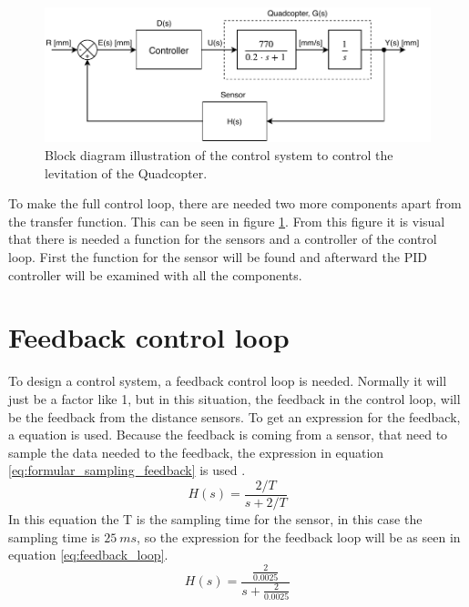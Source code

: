  \begin{figure}[H]
     \centering
     \includegraphics[width=\textwidth]{figures/ch_design/controller/ControlDiagramTF.pdf}
     \caption{Block diagram illustration of the control system  to control the levitation of the Quadcopter.}
     \label{fig:controlDiagram}
 \end{figure}

To make the full control loop, there are needed two more components apart from the transfer function. This can be seen in figure \ref{fig:controlDiagram}. From this figure it is visual that there is needed a function for the sensors and a controller of the control loop. 
First the function for the sensor will be found and afterward the PID controller will be examined with all the components.


\section{Feedback control loop}\label{s:feedback_loop}
To design a control system, a feedback control loop is needed. Normally it will just be a factor like 1, but in this situation, the feedback in the control loop, will be the feedback from the distance sensors. To get an expression for the feedback, a equation is used. Because the feedback is coming from a sensor, that need to sample the data needed to the feedback, the expression in equation \ref{eq:formular_sampling_feedback} is used \cite{digital_control}.
\begin{equation}\label{eq:formular_sampling_feedback}
    H(s)=\frac{2/T}{s+2/T}
\end{equation}
In this equation the T is the sampling time for the sensor, in this case the sampling time is $25\ ms$, so the expression for the feedback loop will be as seen in equation \ref{eq:feedback_loop}\cite{feedback_control}.
\begin{equation}\label{eq:feedback_loop}
    H(s)=\frac{\frac{2}{0.0025}}{s+\frac{2}{0.0025}}
\end{equation}

